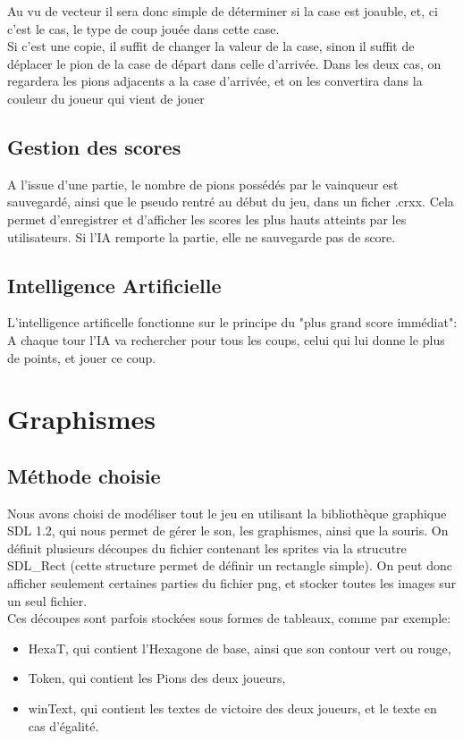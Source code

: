 \documentclass{report}
\begin{document}
	Au vu de vecteur il sera donc simple de déterminer si la case est joauble, et, ci c'est le cas, le type de coup jouée dans cette case.\\
	Si c'est une copie, il suffit de changer la valeur de la case, sinon il suffit de déplacer le pion de la case de départ dans celle d'arrivée. Dans les deux cas, on regardera les pions adjacents a la case d'arrivée, et on les convertira dans la couleur du joueur qui vient de jouer
	\subsection{Gestion des scores}
	
	A l'issue d'une partie, le nombre de pions possédés par le vainqueur est sauvegardé, ainsi que le pseudo rentré au début du jeu, dans un ficher .crxx.
	Cela permet d'enregistrer et d'afficher les scores les plus hauts atteints par les utilisateurs. Si l'IA remporte la partie, elle ne sauvegarde pas de score. 

	\subsection{Intelligence Artificielle}
	
	L'intelligence artificelle fonctionne sur le principe du "plus grand score immédiat": A chaque tour l'IA va rechercher pour tous les coups, celui qui lui donne le plus de points, et jouer ce coup.
	
\newpage
\section{Graphismes}
	\subsection{Méthode choisie}
	
		Nous avons choisi de modéliser tout le jeu en utilisant la bibliothèque graphique SDL 1.2, qui nous permet de gérer le son, les graphismes, ainsi que la souris. On définit plusieurs découpes du fichier contenant les sprites via la strucutre SDL\_Rect (cette structure permet de définir un rectangle simple). On peut donc afficher seulement certaines parties du fichier png, et stocker toutes les images sur un seul fichier.\\
		
		Ces découpes sont parfois stockées sous formes de tableaux, comme par exemple:\begin{itemize}
		\item HexaT, qui contient l'Hexagone de base, ainsi que son contour vert ou rouge,
		\item Token, qui contient les Pions des deux joueurs,
		\item winText, qui contient les textes de victoire des deux joueurs, et le texte en cas d'égalité.
		\end {itemize}
		
\end{document}
